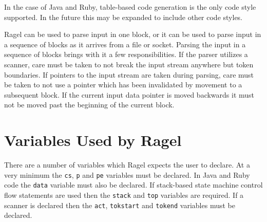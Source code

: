 \documentclass[letterpaper,11pt,oneside]{book}
\begin{document}
In the case of Java and Ruby, table-based code generation is the only code
style supported. In the future this may be expanded to include other code
styles.

Ragel can be used to parse input in one block, or it can be used to parse input
in a sequence of blocks as it arrives from a file or socket.  Parsing the input
in a sequence of blocks brings with it a few responsibilities. If the parser
utilizes a scanner, care must be taken to not break the input stream anywhere
but token boundaries.  If pointers to the input stream are taken during
parsing, care must be taken to not use a pointer which has been invalidated by
movement to a subsequent block.  If the current input data pointer is moved
backwards it must not be moved past the beginning of the current block.

\section{Variables Used by Ragel}

There are a number of variables which Ragel expects the user to declare. At a
very minimum the \verb|cs|, \verb|p| and \verb|pe| variables must be declared.
In Java and Ruby code the \verb|data| variable must also be declared. If
stack-based state machine control flow statements are used then the
\verb|stack| and \verb|top| variables are required. If a scanner is declared
then the \verb|act|, \verb|tokstart| and \verb|tokend| variables must be
declared.
\end{document}
